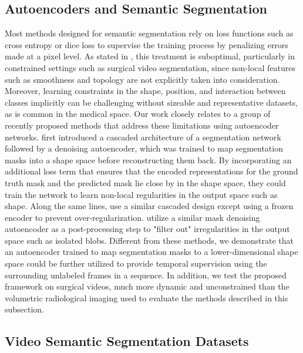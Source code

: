 \documentclass[twoside, print]{ieeecolor_arxiv}
\begin{document}
\subsection{Autoencoders and Semantic Segmentation}
Most methods designed for semantic segmentation rely on loss functions such as cross entropy or dice loss to supervise the training process by penalizing errors made at a pixel level. As stated in \cite{acnn}, this treatment is suboptimal, particularly in constrained settings such as surgical video segmentation, since non-local features such as smoothness and topology are not explicitly taken into consideration. Moreover, learning constraints in the shape, position, and interaction between classes implicitly can be challenging without sizeable and representative datasets, as is common in the medical space.
Our work closely relates to a group of recently proposed methods that address these limitations using autoencoder networks. \cite{ravishankar} first introduced a cascaded architecture of a segmentation network followed by a denoising autoencoder, which was trained to map segmentation masks into a shape space before reconstructing them back. By incorporating an additional loss term that ensures that the encoded representations for the ground truth mask and the predicted mask lie close by in the shape space, they could train the network to learn non-local regularities in the output space such as shape. Along the same lines, \cite{acnn} use a similar cascaded design except using a frozen encoder to prevent over-regularization. \cite{postdae1}\cite{postdae2} utilize a similar mask denoising autoencoder as a post-processing step to "filter out" irregularities in the output space such as isolated blobs. Different from these methods, we demonstrate that an autoencoder trained to map segmentation masks to a lower-dimensional shape space could be further utilized to provide temporal supervision using the surrounding unlabeled frames in a sequence. In addition, we test the proposed framework on surgical videos, much more dynamic and unconstrained than the volumetric radiological imaging used to evaluate the methods described in this subsection.

\subsection{Video Semantic Segmentation Datasets}
\end{document}
